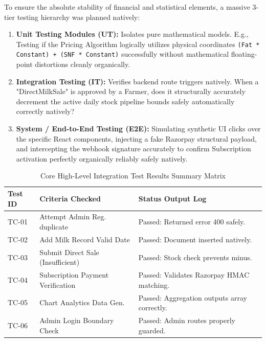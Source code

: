 \documentclass[12pt,a4paper]{report}
\begin{document}
To ensure the absolute stability of financial and statistical elements, a massive 3-tier testing hierarchy was planned natively:

\begin{enumerate}
    \item \textbf{Unit Testing Modules (UT):} Isolates pure mathematical models. E.g., Testing if the Pricing Algorithm logically utilizes physical coordinates \texttt{(Fat * Constant) + (SNF * Constant)} successfully without mathematical floating-point distortions cleanly organically.
    \item \textbf{Integration Testing (IT):} Verifies backend route triggers natively. When a "DirectMilkSale" is approved by a Farmer, does it structurally accurately decrement the active daily stock pipeline bounds safely automatically correctly natively?
    \item \textbf{System / End-to-End Testing (E2E):} Simulating synthetic UI clicks over the specific React components, injecting a fake Razorpay structural payload, and intercepting the webhook signature accurately to confirm Subscription activation perfectly organically reliably safely natively.
\end{enumerate}

\vspace{0.4cm}
\begin{table}[htbp]
\centering
\begin{tabular}{|p{2cm}|p{6cm}|p{6cm}|}
\hline
\textbf{Test ID} & \textbf{Criteria Checked} & \textbf{Status Output Log} \\ \hline
TC-01 & Attempt Admin Reg. duplicate & Passed: Returned error 400 safely. \\ \hline
TC-02 & Add Milk Record Valid Date & Passed: Document inserted natively. \\ \hline
TC-03 & Submit Direct Sale (Insufficient) & Passed: Stock check prevents minus. \\ \hline
TC-04 & Subscription Payment Verification & Passed: Validates Razorpay HMAC matching. \\ \hline
TC-05 & Chart Analytics Data Gen. & Passed: Aggregation outputs array correctly. \\ \hline
TC-06 & Admin Login Boundary Check & Passed: Admin routes properly guarded. \\ \hline
\end{tabular}
\caption{Core High-Level Integration Test Results Summary Matrix}
\end{table}
\vspace{0.4cm}
\end{document}
